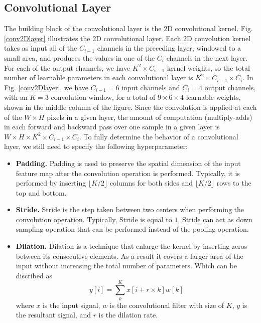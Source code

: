 \subsection{Convolutional Layer}
The building block of the convolutional layer is the 2D convolutional kernel. Fig. \ref{conv2Dlayer} illustrates the 2D convolutional layer. Each 2D convolution kernel takes as input all of the $C_{i-1}$ channels in the preceding layer, windowed to a small area, and produces the values in one of the $C_{i}$ channels in the next layer. For each of the output channels, we have $K^2\times C_{i-1}$ kernel weights, so the total number of learnable parameters in each convolutional layer is $K^2\times C_{i-1} \times C_{i}$. In Fig. \ref{conv2Dlayer}, we have $C_{i-1} = 6$ input channels and $C_{i} = 4$ output channels, with an $K = 3$ convolution window, for a total of $9 \times 6 \times 4$ learnable weights, shown in the middle column of the figure. Since the convolution is applied at each of the $W \times H$ pixels in a given layer, the amount of computation (multiply-adds) in each forward and backward pass
over one sample in a given layer is $W\times H \times K^{2} \times C_{i-1} \times C_{i}$.
To fully determine the behavior of a convolutional layer, we still need to specify the following hyperparameter:
\begin{itemize}
    \item \textbf{Padding.} Padding is used to preserve the spatial dimension of the input feature map after the convolution operation is performed. Typically, it is performed by inserting $\lfloor K/2 \rfloor$ columns for both sides and $\lfloor K/2 \rfloor$ rows to the top and bottom.
    \item \textbf{Stride.} Stride is the step taken between two centers when performing the convolution operation. Typically, Stride is equal to $1$. Stride can act as down sampling operation that can be performed instead of the pooling operation.
    \item \textbf{Dilation.} Dilation is a technique that enlarge the kernel by inserting zeros between its consecutive elements. As a result it covers a larger area of the input without increasing the total number of parameters. Which can be discribed as \[y[i]=\sum_{k}^{K} x[i+r\times k] w[k]\] where $x$ is the input signal, $w$ is the convolutional filter with size of $K$, $y$ is the resultant signal, and $r$ is the dilation rate.
\end{itemize}

